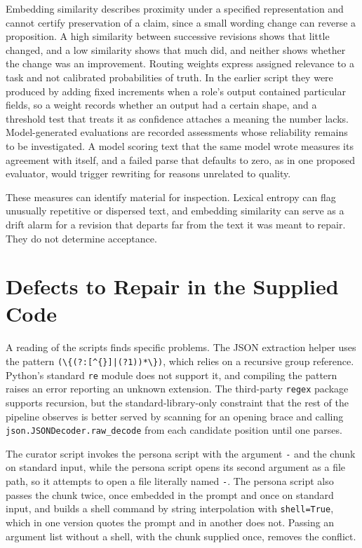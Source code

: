 \documentclass[11pt]{article}
\begin{document}
Embedding similarity describes proximity under a specified representation and cannot certify preservation of a claim, since a small wording change can reverse a proposition. A high similarity between successive revisions shows that little changed, and a low similarity shows that much did, and neither shows whether the change was an improvement. Routing weights express assigned relevance to a task and not calibrated probabilities of truth. In the earlier script they were produced by adding fixed increments when a role's output contained particular fields, so a weight records whether an output had a certain shape, and a threshold test that treats it as confidence attaches a meaning the number lacks. Model-generated evaluations are recorded assessments whose reliability remains to be investigated. A model scoring text that the same model wrote measures its agreement with itself, and a failed parse that defaults to zero, as in one proposed evaluator, would trigger rewriting for reasons unrelated to quality.

These measures can identify material for inspection. Lexical entropy can flag unusually repetitive or dispersed text, and embedding similarity can serve as a drift alarm for a revision that departs far from the text it was meant to repair. They do not determine acceptance.

\section{Defects to Repair in the Supplied Code}\label{sec:defects}

A reading of the scripts finds specific problems. The JSON extraction helper uses the pattern \texttt{(\textbackslash\{(?:[\textasciicircum\{\}]|(?1))*\textbackslash\})}, which relies on a recursive group reference. Python's standard \texttt{re} module does not support it, and compiling the pattern raises an error reporting an unknown extension. The third-party \texttt{regex} package supports recursion, but the standard-library-only constraint that the rest of the pipeline observes is better served by scanning for an opening brace and calling \texttt{json.JSONDecoder.raw\_decode} from each candidate position until one parses.

The curator script invokes the persona script with the argument \texttt{-} and the chunk on standard input, while the persona script opens its second argument as a file path, so it attempts to open a file literally named \texttt{-}. The persona script also passes the chunk twice, once embedded in the prompt and once on standard input, and builds a shell command by string interpolation with \texttt{shell=True}, which in one version quotes the prompt and in another does not. Passing an argument list without a shell, with the chunk supplied once, removes the conflict.
\end{document}
